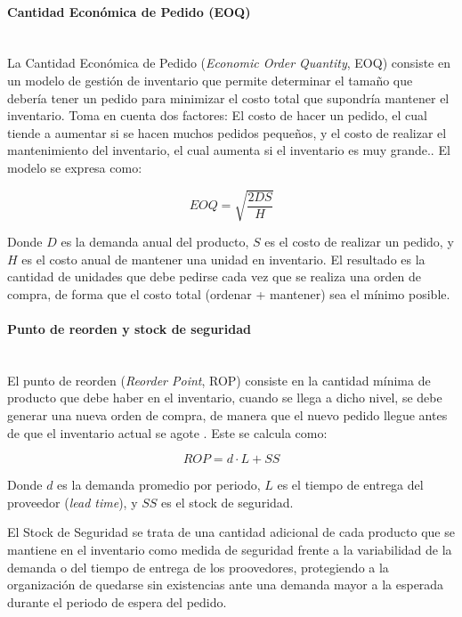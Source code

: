 \paragraph{Cantidad Económica de Pedido (EOQ)}\mbox{}\\
La Cantidad Económica de Pedido (\textit{Economic Order Quantity}, EOQ) consiste en un modelo de gestión de inventario que permite determinar el tamaño que debería tener un pedido para minimizar el costo total que supondría mantener el inventario. Toma en cuenta dos factores: El costo de hacer un pedido, el cual tiende a aumentar si se hacen muchos pedidos pequeños, y el costo de realizar el mantenimiento del inventario, el cual aumenta si el inventario es muy grande.\cite{setyadi2024eoq}. El modelo se expresa como:

\begin{equation}
EOQ = \sqrt{\frac{2DS}{H}}
\end{equation}

Donde $D$ es la demanda anual del producto, $S$ es el costo de realizar un pedido, y $H$ es el costo anual de mantener una unidad en inventario. El resultado es la cantidad de unidades que debe pedirse cada vez que se realiza una orden de compra, de forma que el costo total (ordenar + mantener) sea el mínimo posible.

\paragraph{Punto de reorden y stock de seguridad}\mbox{}\\

El punto de reorden (\textit{Reorder Point}, ROP) consiste en la cantidad mínima de producto que debe haber en el inventario, cuando se llega a dicho nivel, se debe generar una nueva orden de compra, de manera que el nuevo pedido llegue antes de que el inventario actual se agote \cite{setyadi2024eoq}. Este se calcula como:

\begin{equation}
ROP = d \cdot L + SS
\end{equation}

Donde $d$ es la demanda promedio por periodo, $L$ es el tiempo de entrega del proveedor (\textit{lead time}), y $SS$ es el stock de seguridad.

El Stock de Seguridad se trata de una cantidad adicional de cada producto que se mantiene en el inventario como medida de seguridad frente a la variabilidad de la demanda o del tiempo de entrega de los proovedores, protegiendo a la organización de quedarse sin existencias ante una demanda mayor a la esperada durante el periodo de espera del pedido.

